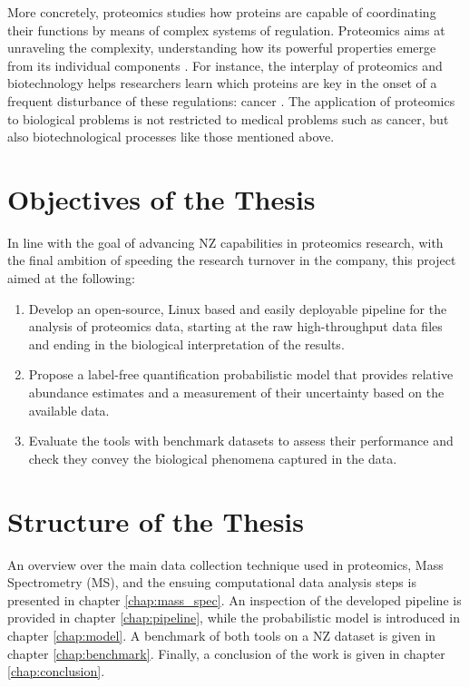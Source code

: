 More concretely, proteomics studies how proteins are capable of coordinating their functions by means of complex systems of regulation.  Proteomics aims at unraveling the complexity, understanding how its powerful properties emerge from its individual components \cite{Milo2002}. For instance, the interplay of proteomics and biotechnology helps researchers learn which proteins are key in the onset of a frequent disturbance of these regulations: cancer \cite{Saraon2012}. The application of proteomics to biological problems is not restricted to medical problems such as cancer, but also biotechnological processes like those mentioned above.





\section{Objectives of the Thesis}
\label{sec:objectives}

In line with the goal of advancing \ac{NZ} capabilities in proteomics research, with the final ambition of speeding the research turnover in the company, this project aimed at the following:

\begin{enumerate}

\item Develop an open-source, Linux based and easily deployable pipeline for the analysis of proteomics data, starting at the raw high-throughput data files and ending in the  biological interpretation of the results.

\item Propose a label-free quantification probabilistic model that provides relative abundance estimates and a measurement of their uncertainty based on the available data.


\item Evaluate the tools with benchmark datasets to assess their performance and check they convey the biological phenomena captured in the data.



\end{enumerate}

\section{Structure of the Thesis}

An overview over the main data collection technique used in proteomics, Mass Spectrometry (\ac{MS}), and the ensuing computational data analysis steps is presented in chapter \ref{chap:mass_spec}. An inspection of the developed pipeline is provided in chapter \ref{chap:pipeline}, while the probabilistic model is introduced in chapter \ref{chap:model}. A benchmark of both tools on a \ac{NZ} dataset is given in chapter \ref{chap:benchmark}. Finally, a conclusion of the work is given in chapter \ref{chap:conclusion}.
